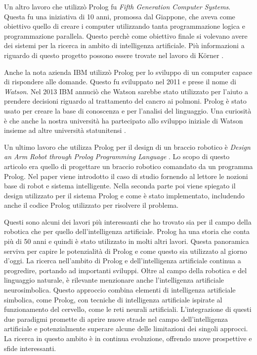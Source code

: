 Un altro lavoro che utilizzò Prolog fu \textit{Fifth Generation Computer Systems}. Questa fu una iniziativa di 10 anni, promossa dal Giappone, che aveva come obiettivo quello di creare i computer utilizzando tanta programmazione logica e programmazione parallela.
Questo perchè come obiettivo finale si volevano avere dei sistemi per la ricerca in ambito di intelligenza artificiale. Più informazioni a riguardo di questo progetto possono essere trovate nel lavoro di K\"orner \cite{korner2022fifty}.

Anche la nota azienda IBM utilizzò Prolog per lo sviluppo di un computer capace di rispondere alle domande. Questo fu sviluppato nel 2011 e prese il nome di \textit{Watson}. Nel 2013 IBM annuciò che Watson sarebbe stato utilizzato per l'aiuto a prendere decisioni riguardo al trattamento del cancro ai polmoni. Prolog è stato usato per creare la base di conoscenza e per l'analisi del linguaggio.
Una curiosità è che anche la nostra università ha partecipato allo sviluppo iniziale di Watson insieme ad altre università statunitensi \cite{unitnwatson}. 

Un ultimo lavoro che utilizza Prolog per il design di un braccio robotico è \textit{Design an Arm Robot through Prolog Programming Language} \cite{mustafa2013design}. Lo scopo di questo articolo era quello di progettare un braccio robotico comandato da un programma Prolog. Nel paper viene introdotto il caso di studio fornendo al lettore le nozioni base di robot e sistema intelligente.
Nella seconda parte poi viene spiegato il design utilizzato per il sistema Prolog e come è stato implementato, includendo anche il codice Prolog utilizzato per risolvere il problema.

Questi sono alcuni dei lavori più interessanti che ho trovato sia per il campo della robotica che per quello dell'intelligenza artificiale. Prolog ha una storia che conta più di 50 anni e quindi è stato utilizzato in molti altri lavori. Questa panoramica serviva per capire le potenzialità di Prolog
e come questo sia utilizzato al giorno d'oggi. La ricerca nell'ambito di Prolog e dell'intelligenza artificiale continua a progredire, portando ad importanti sviluppi. Oltre al campo della robotica e del linguaggio naturale, è rilevante menzionare anche l'intelligenza artificiale neurosimbolica. Questo approccio combina elementi di intelligenza artificiale simbolica, come Prolog, con tecniche di intelligenza artificiale ispirate al funzionamento del cervello, come le reti neurali artificiali. L'integrazione di questi due paradigmi promette di aprire nuove strade nel campo dell'intelligenza artificiale e potenzialmente superare alcune delle limitazioni dei singoli approcci. La ricerca in questo ambito è in continua evoluzione, offrendo nuove prospettive e sfide interessanti.

